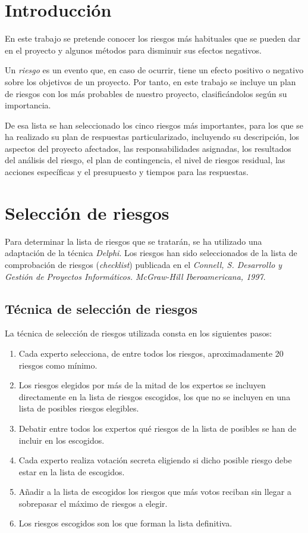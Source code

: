 \documentclass[11pt,a4paper,spanish,twoside]{report}
\begin{document}
\tableofcontents
\listoftables
\listoffigures


\chapter*{Introducción}

En este trabajo se pretende conocer los riesgos más habituales que se pueden 
dar en el proyecto y algunos métodos para disminuir sus efectos negativos.

Un \emph{riesgo} es un evento que, en caso de ocurrir, tiene un efecto
positivo o negativo sobre los objetivos de un proyecto. Por tanto, en este
trabajo se incluye un plan de riesgos con los más probables de nuestro
proyecto, clasificándolos según su importancia.

De esa lista se han seleccionado los cinco riesgos más importantes, para los
que se ha realizado su plan de respuestas particularizado, incluyendo su 
descripción, los aspectos del proyecto afectados, las responsabilidades 
asignadas, los resultados del análisis del riesgo, el plan de contingencia,
el nivel de riesgos residual, las acciones específicas y el presupuesto y 
tiempos para las respuestas.

\chapter{Selección de riesgos}
Para determinar la lista de riesgos que se tratarán, se ha utilizado una
adaptación de la técnica \emph{Delphi}. Los riesgos han sido seleccionados de
la lista de comprobación de riesgos (\emph{checklist}) publicada en el 
\emph{Connell, S. Desarrollo y Gestión de Proyectos Informáticos. McGraw-Hill
Iberoamericana, 1997}.

\section{Técnica de selección de riesgos}
La técnica de selección de riesgos utilizada consta en los siguientes pasos:

\begin{enumerate}
\item Cada experto selecciona, de entre todos los riesgos, aproximadamente 
20 riesgos como mínimo.
\item Los riesgos elegidos por más de la mitad de los expertos se incluyen 
directamente en la lista de riesgos escogidos, los que no se incluyen en una 
lista de posibles riesgos elegibles.
\item Debatir entre todos los expertos qué riesgos de la lista de posibles se 
han de incluir en los escogidos. 
\item Cada experto realiza votación secreta eligiendo si dicho posible riesgo 
debe estar en la lista de escogidos.
\item Añadir a la lista de escogidos los riesgos que más votos reciban sin 
llegar a sobrepasar el máximo de riesgos a elegir.
\item Los riesgos escogidos son los que forman la lista definitiva.
\end{enumerate}
\end{document}
